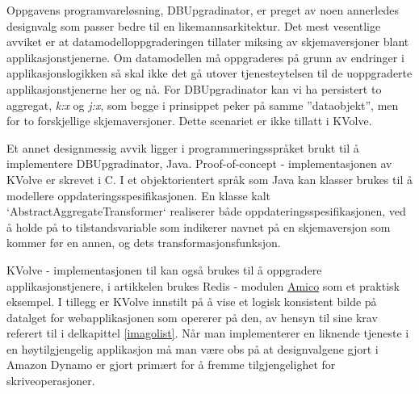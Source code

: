 Oppgavens programvareløsning, DBUpgradinator, er preget av noen annerledes designvalg som passer bedre til en likemannsarkitektur. Det mest vesentlige avviket er at datamodelloppgraderingen tillater miksing av skjemaversjoner blant applikasjonstjenerne. Om datamodellen må oppgraderes på grunn av endringer i applikasjonslogikken så skal ikke det gå utover tjenesteytelsen til de uoppgraderte applikasjonstjenerne her og nå. For DBUpgradinator kan vi ha persistert to aggregat, \emph{k:x} og \emph{j:x}, som begge i prinsippet peker på samme ''dataobjekt'', men for to forskjellige skjemaversjoner. Dette scenariet er ikke tillatt i KVolve.

Et annet designmessig avvik ligger i programmeringsspråket brukt til å implementere DBUpgradinator, Java. Proof-of-concept - implementasjonen av KVolve er skrevet i C. I et objektorientert språk som Java kan klasser brukes til å modellere oppdateringsspesifikasjonen. En klasse kalt `AbstractAggregateTransformer` realiserer både oppdateringsspesifikasjonen, ved å holde på to tilstandsvariable som indikerer navnet på en skjemaversjon som kommer før en annen, og dets transformasjonsfunksjon.

KVolve - implementasjonen til \cite{saur2016} kan også brukes til å oppgradere applikasjonstjenere, i artikkelen brukes Redis - modulen \underline{Amico} som et praktisk eksempel. I tillegg er KVolve innstilt på å vise et logisk konsistent bilde på datalget for webapplikasjonen som opererer på den, av hensyn til \cite{dumitras2009nodowntime} sine krav referert til i delkapittel \ref{imagolist}. Når man implementerer en liknende tjeneste i en høytilgjengelig applikasjon må man være obs på at designvalgene gjort i Amazon Dynamo er gjort primært for å fremme tilgjengelighet for skriveoperasjoner.